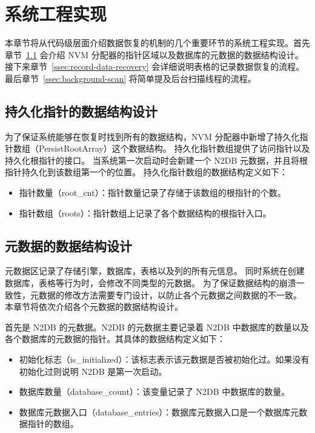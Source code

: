 \section{系统工程实现}
本章节将从代码级层面介绍数据恢复的机制的几个重要环节的系统工程实现。首先章节~\ref{ssec:data-structure-recovery} 会介绍 NVM 分配器的指针区域以及数据库的元数据的数据结构设计。
接下来章节~\ref{ssec:record-data-recovery} 会详细说明表格的记录数据恢复的流程。
最后章节~\ref{ssec:background-scan} 将简单提及后台扫描线程的流程。

\subsection{持久化指针的数据结构设计}
\label{ssec:data-structure-recovery}

为了保证系统能够在恢复时找到所有的数据结构，NVM 分配器中新增了持久化指针数组（PersistRootArray）这个数据结构。
持久化指针数组提供了访问指针以及持久化根指针的接口。
当系统第一次启动时会新建一个 N2DB 元数据，并且将根指针持久化到该数组第一个的位置。
持久化指针数组的数据结构定义如下：
\begin{itemize}
    \item 指针数量（root\_cnt）：指针数量记录了存储于该数组的根指针的个数。
    \item 指针数组（roots）：指针数组上记录了各个数据结构的根指针入口。
\end{itemize}



\subsection{元数据的数据结构设计}

元数据区记录了存储引擎，数据库，表格以及列的所有元信息。
同时系统在创建数据库，表格等行为时，会修改不同类型的元数据。
为了保证数据结构的崩溃一致性，元数据的修改方法需要专门设计，以防止各个元数据之间数据的不一致。
本章节将依次介绍各个元数据的数据结构设计。

首先是 N2DB 的元数据。N2DB 的元数据主要记录着 N2DB 中数据库的数量以及各个数据库的元数据的指针。其具体的数据结构定义如下：
\begin{itemize}
    \item 初始化标志（is\_initialized）：该标志表示该元数据是否被初始化过。如果没有初始化过则说明 N2DB 是第一次启动。
    \item 数据库数量（database\_count）：该变量记录了 N2DB 中数据库的数量。
    \item 数据库元数据入口（database\_entries）：数据库元数据入口是一个数据库元数据指针的数组。
\end{itemize}

